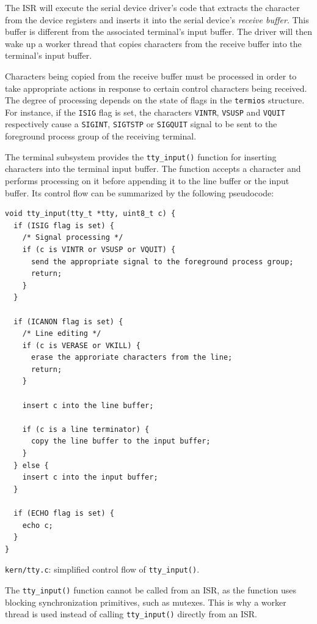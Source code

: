 \documentclass[shortabstract, manyadvisors, english, mgr]{iithesis}
\begin{document}
The ISR will execute the serial device driver's code that extracts the character
from the device registers and inserts it into the serial device's
\textit{receive buffer}. This buffer is different from the associated terminal's
input buffer. The driver will then wake up a worker thread that copies
characters from the receive buffer into the terminal's input buffer.

Characters being copied from the receive buffer must be processed in order to
take appropriate actions in response to certain control characters being
received. The degree of processing depends on the state of flags in the
\texttt{termios} structure. For instance, if the \texttt{ISIG} flag is set, the
characters \texttt{VINTR}, \texttt{VSUSP} and \texttt{VQUIT} respectively cause
a \texttt{SIGINT}, \texttt{SIGTSTP} or \texttt{SIGQUIT} signal to be sent to the
foreground process group of the receiving terminal.

The terminal subsystem provides the \texttt{tty\_input()} function for inserting
characters into the terminal input buffer. The function accepts a character and
performs processing on it before appending it to the line buffer or the input
buffer. Its control flow can be summarized by the following pseudocode:

\begin{listing}[H]
\begin{verbatim}
void tty_input(tty_t *tty, uint8_t c) {
  if (ISIG flag is set) {
    /* Signal processing */
    if (c is VINTR or VSUSP or VQUIT) {
      send the appropriate signal to the foreground process group;
      return;
    }
  }

  if (ICANON flag is set) {
    /* Line editing */
    if (c is VERASE or VKILL) {
      erase the approriate characters from the line;
      return;
    }

    insert c into the line buffer;
    
    if (c is a line terminator) {
      copy the line buffer to the input buffer; 
    }
  } else {
    insert c into the input buffer;
  }

  if (ECHO flag is set) {
    echo c;
  }
}
\end{verbatim}
\caption{\texttt{kern/tty.c}: simplified control flow of \texttt{tty\_input()}.}
\end{listing}

The \texttt{tty\_input()} function cannot be called from an ISR, as the function
uses blocking synchronization primitives, such as mutexes. This is why a worker
thread is used instead of calling \texttt{tty\_input()} directly from an ISR.
\end{document}
